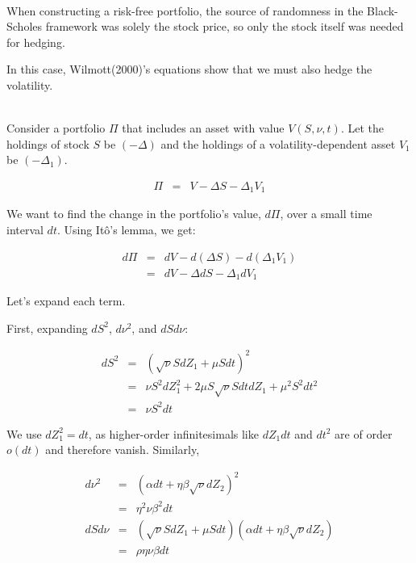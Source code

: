 \documentclass[uplatex,a4j,12pt,dvipdfmx]{jsarticle}
\begin{document}
\ \\

When constructing a risk-free portfolio, the source of randomness in the Black-Scholes framework was solely the stock price, so only the stock itself was needed for hedging.

In this case, Wilmott(2000)'s equations show that we must also hedge the volatility.

\ \\

Consider a portfolio $\Pi$ that includes an asset with value $V(S,\nu,t)$. Let the holdings of stock $S$ be $(-\Delta)$ and the holdings of a volatility-dependent asset $V_{1}$ be $(-\Delta_{1})$.

\begin{eqnarray*}
	\Pi
	&=&
	V - \Delta S - \Delta_{1} V_{1}
\end{eqnarray*}

We want to find the change in the portfolio's value, $d\Pi$, over a small time interval $dt$. Using Itô's lemma, we get:

\begin{eqnarray*}
	d \Pi
	&=&
	dV - d(\Delta S) - d(\Delta_{1} V_{1})
	\\ &=&
	dV - \Delta dS - \Delta_{1} dV_{1}
\end{eqnarray*}

Let's expand each term.

First, expanding $dS^{2}$, $d\nu^{2}$, and $dSd\nu$:

\begin{eqnarray*}
	dS^{2}
	&=&
	(\sqrt{\nu} S dZ_{1} + \mu S dt)^{2}
	\\ &=&
	\nu S^{2} dZ_{1}^{2}
	+
	2 \mu S \sqrt{\nu} S dt dZ_{1}
	+
	\mu^{2} S^{2} dt^{2}
	\\ &=&
	\nu S^{2} dt
\end{eqnarray*}

We use $dZ_{1}^{2} = dt$, as higher-order infinitesimals like $dZ_{1}dt$ and $dt^{2}$ are of order $o(dt)$ and therefore vanish. Similarly,

\begin{eqnarray*}
	d \nu^{2}
	&=&
	( \alpha dt + \eta \beta \sqrt{\nu} dZ_{2} )^{2}
	\\ &=&
	\eta^{2} \nu \beta^{2} dt
	\\[3mm]
	dS d \nu
	&=&
	(\sqrt{\nu} S dZ_{1} + \mu S dt)
	( \alpha dt + \eta \beta \sqrt{\nu} dZ_{2} )
	\\ &=&
	\rho \eta \nu \beta dt
\end{eqnarray*}
\end{document}
